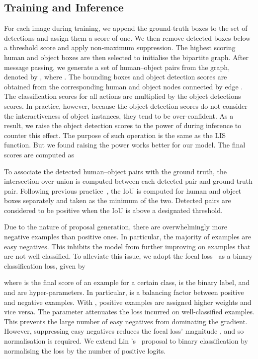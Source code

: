 \documentclass[10pt,twocolumn,letterpaper]{article}
\begin{document}
\subsection{Training and Inference}

For each image during training, we append the ground-truth boxes to the set of detections and assign them a score of one. We then remove detected boxes below a threshold score and apply non-maximum suppression. The  highest scoring human and object boxes are then selected to initialise the bipartite graph. After message passing, we generate a set of human--object pairs from the graph, denoted by , where .
The bounding boxes  and object detection scores  are obtained from the corresponding human and object nodes connected by edge . The classification scores for all actions  are multiplied by the object detections scores.
In practice, however, because the object detection scores do not consider the interactiveness of object instances, they tend to be over-confident. As a result, we raise the object detection scores to the power of  during inference to counter this effect. The purpose of such operation is the same as the LIS~\cite{li2019} function. But we found raising the power works better for our model. The final scores are computed as


To associate the detected human--object pairs with the ground truth, the intersection-over-union is computed between each detected pair and ground-truth pair. Following previous practice~\cite{chao2018}, the IoU is computed for human and object boxes separately and taken as the minimum of the two. Detected pairs are considered to be positive when the IoU is above a designated threshold.

Due to the nature of proposal generation, there are overwhelmingly more negative examples than positive ones. In particular, the majority of examples are easy negatives. This inhibits the model from further improving on examples that are not well classified. To alleviate this issue, we adopt the focal loss~\cite{lin2017iccv} as a binary classification loss, given by

where  is the final score of an example for a certain class,  is the binary label, and  and  are hyper-parameters. In particular,  is a balancing factor between positive and negative examples. With , positive examples are assigned higher weights and vice versa. The parameter  attenuates the loss incurred on well-classified examples. This prevents the large number of easy negatives from dominating the gradient. However, suppressing easy negatives reduces the focal loss' magnitude \cite{lin2017iccv}, and so normalisation is required. We extend Lin \etal's~\cite{lin2017iccv} proposal to binary classification by normalising the loss by the number of positive logits.
\end{document}
